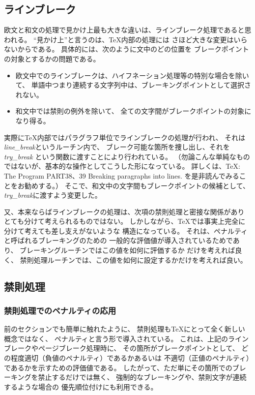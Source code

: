 \subsection{ラインブレーク}
欧文と和文の処理で見かけ上最も大きな違いは、ラインブレーク処理であると思われる。
``見かけ上''と言うのは、\TeX 内部の処理には
さほど大きな変更はいらないからである。
具体的には、次のように文中のどの位置を
ブレークポイントの対象とするかの問題である。
\begin{itemize}
\item 欧文中でのラインブレークは、ハイフネーション処理等の特別な場合を除いて、
単語中つまり連続する文字列中は、ブレーキングポイントとして選択されない。
\item 和文中では禁則の例外を除いて、
全ての文字間がブレークポイントの対象になり得る。
\end{itemize}
実際に\TeX 内部ではパラグラフ単位でラインブレークの処理が行われ、
それは{\it line\_break}というルーチン内で、
ブレーク可能な箇所を捜し出し、それを{\it try\_break}
という関数に渡すことにより行われている。
（勿論こんな単純なものではないが、基本的な操作としてこうした形になっている。
詳しくは、\TeX: The Program PART38、39 Breaking paragraphs into lines.
を是非読んでみることをお勧めする。）
そこで、和文中の文字間もブレークポイントの候補として、
{\it try\_break}に渡すよう変更した。

又、本来ならばラインブレークの処理は、次項の禁則処理と密接な関係があり
とても分けて考えられるものではない。
しかしながら、\TeX では事実上完全に分けて考えても差し支えがないような
構造になっている。
それは、ペナルティと呼ばれるブレーキングのための
一般的な評価値が導入されているためであり、
ブレーキングルーチンではこの値を如何に評価するか
だけを考えれば良く、
禁則処理ルーチンでは、この値を如何に設定するかだけを考えれば良い。
%
\subsection{禁則処理}
%
\subsubsection{禁則処理でのペナルティの応用}
前のセクションでも簡単に触れたように、
禁則処理も\TeX にとって全く新しい概念ではなく、
ペナルティと言う形で導入されている。
これは、上記のラインブレークやページブレーク処理時に、
その箇所がブレークポイントとして、
どの程度適切（負値のペナルティ）であるかあるいは
不適切（正値のペナルティ）であるかを示すための評価値である。
したがって、ただ単にその箇所でのブレーキングを禁止するだけでは無く、
強制的なブレーキングや、禁則文字が連続するような場合の
優先順位付けにも利用できる。

